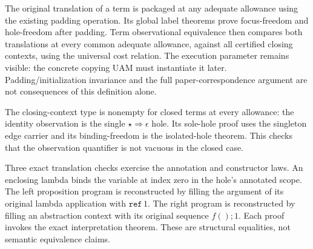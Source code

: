











The original translation of a term is packaged at any adequate allowance
using the existing padding operation. Its global label theorems prove
focus-freedom and hole-freedom after padding. Term observational equivalence
then compares both translations at every common adequate allowance, against
all certified closing contexts, using the universal cost relation. The
execution parameter remains visible: the concrete copying UAM must instantiate
it later. Padding/initialization invariance and the full paper-correspondence
argument are not consequences of this definition alone.





The closing-context type is nonempty for closed terms at every allowance:
the identity observation is the single $\star\Rightarrow\epsilon$ hole.
Its sole-hole proof uses the singleton edge carrier and its binding-freedom
is the isolated-hole theorem. This checks that the observation quantifier
is not vacuous in the closed case.

Three exact translation checks exercise the annotation and constructor laws.
An enclosing lambda binds the variable at index zero in the hole's annotated
scope. The left proposition program is reconstructed by filling the argument
of its original lambda application with $\mathtt{ref}\,1$. The right program
is reconstructed by filling an abstraction context with its original sequence
$f();1$. Each proof invokes the exact interpretation theorem. These are
structural equalities, not semantic equivalence claims.






